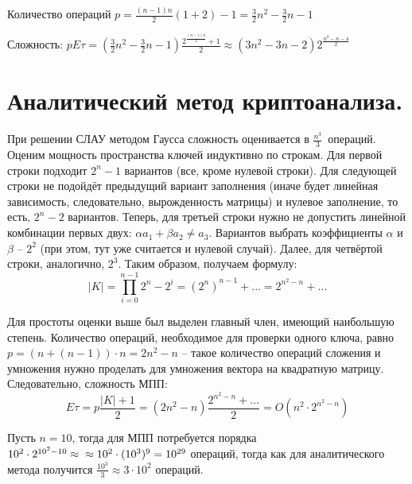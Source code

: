 \documentclass[letterpaper,11pt,openany]{book}
\begin{document}
\noindent Количество операций $p = \frac{(n-1)n}{2}(1 + 2) - 1 = \frac{3}{2} n ^ 2 - \frac{3}{2} n - 1$

\noindent Сложность: $pE\tau = (\frac{3}{2} n ^ 2 - \frac{3}{2} n - 1) \frac{2 ^ { \frac{(n-1)n}{2} } + 1}{2} \approx (3 n ^ 2 - 3 n - 2) 2 ^ { \frac{n ^ 2 - n - 4}{2}}$

\newpage

\section{Аналитический метод криптоанализа.}


При решении СЛАУ методом Гаусса сложность оценивается в $\frac{n^3}{3}$~операций. Оценим мощность пространства ключей индуктивно по строкам. Для первой строки подходит $2^n - 1$ вариантов (все, кроме нулевой строки). Для следующей строки не подойдёт предыдущий вариант заполнения (иначе будет линейная зависимость, следовательно, вырожденность матрицы) и нулевое заполнение, то есть, $2^n - 2$ вариантов. Теперь, для третьей строки нужно не допустить линейной комбинации первых двух: $\alpha a_1 + \beta a_2 \ne a_3$. Вариантов выбрать коэффициенты $\alpha$ и $\beta$ -- $2^2$ (при этом, тут уже считается и нулевой случай). Далее, для четвёртой строки, аналогично, $2^3$. Таким образом, получаем формулу:
$$|K| = \prod_{i = 0} ^ {n - 1} 2^n - 2^i = (2 ^ n) ^ {n-1} + ... = 2 ^ {n^2 - n} + ...$$

\noindent Для простоты оценки выше был выделен главный член, имеющий наибольшую степень. Количество операций, необходимое для проверки одного ключа, равно $p = (n + (n - 1)) \cdot n = 2 n ^ 2 - n$ -- такое количество операций сложения и умножения нужно проделать для умножения вектора на квадратную матрицу. Следовательно, сложность МПП:
$$E\tau = p \frac{|K| + 1}{2} = (2 n ^ 2 - n) \frac{2 ^ {n^2 - n} + ...}{2} = O (n^2 \cdot 2 ^ {n^2 -n})$$

Пусть $n = 10$, тогда для МПП потребуется порядка $10^2 \cdot 2 ^ {10^2 - 10} \approx \\ \approx 10^2 \cdot (10^3)^9  = 10^{29}$ операций, тогда как для аналитического метода получится $\frac{10^3}{3} \approx 3 \cdot 10^2$ операций.
\end{document}
